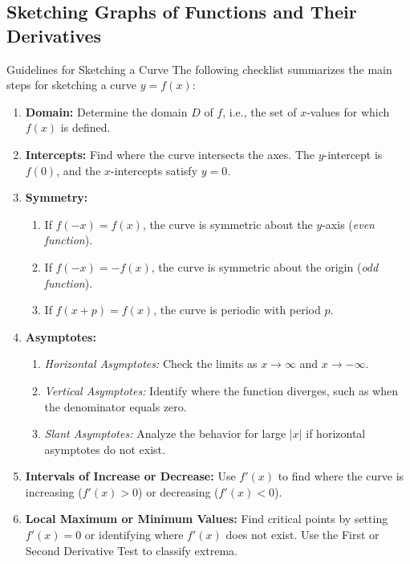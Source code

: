 \documentclass[12pt]{article}
\theoremstyle{beautifulthm}
\begin{document}
\subsection{Sketching Graphs of Functions and Their Derivatives }
\begin{Note}{Guidelines for Sketching a Curve}
\noindent The following checklist summarizes the main steps for sketching a curve \( y = f(x) \):
\begin{enumerate} %
    \item \textbf{Domain:} Determine the domain \( D \) of \( f \), i.e., the set of \( x \)-values for which \( f(x) \) is defined.

    \item \textbf{Intercepts:} Find where the curve intersects the axes. The \( y \)-intercept is \( f(0) \), and the \( x \)-intercepts satisfy \( y = 0 \).

    \item \textbf{Symmetry:} 
    \begin{enumerate}
        \item If \( f(-x) = f(x) \), the curve is symmetric about the \( y \)-axis (\textit{even function}).
        \item If \( f(-x) = -f(x) \), the curve is symmetric about the origin (\textit{odd function}).
        \item If \( f(x + p) = f(x) \), the curve is periodic with period \( p \).
    \end{enumerate}

    \item \textbf{Asymptotes:} 
    \begin{enumerate}
        \item \textit{Horizontal Asymptotes:} Check the limits as \( x \to \infty \) and \( x \to -\infty \).
        \item \textit{Vertical Asymptotes:} Identify where the function diverges, such as when the denominator equals zero.
        \item \textit{Slant Asymptotes:} Analyze the behavior for large \( |x| \) if horizontal asymptotes do not exist.
    \end{enumerate}

    \item \textbf{Intervals of Increase or Decrease:} Use \( f'(x) \) to find where the curve is increasing (\( f'(x) > 0 \)) or decreasing (\( f'(x) < 0 \)).

    \item \textbf{Local Maximum or Minimum Values:} Find critical points by setting \( f'(x) = 0 \) or identifying where \( f'(x) \) does not exist. Use the First or Second Derivative Test to classify extrema.


\end{enumerate}
\end{Note}
\end{document}
